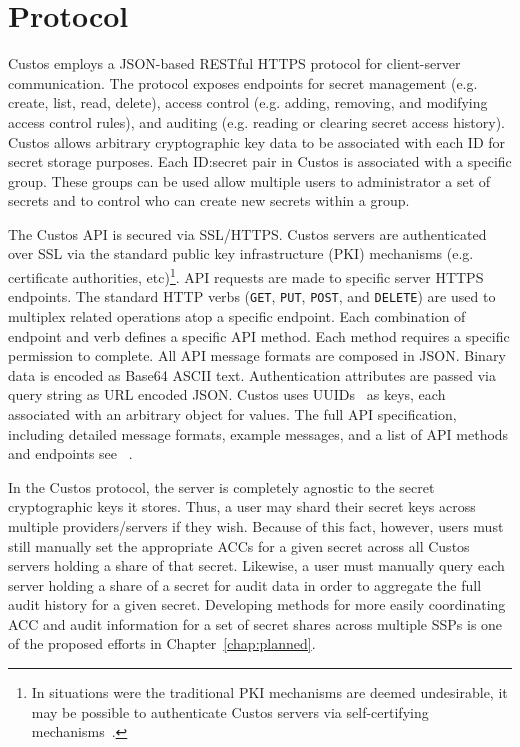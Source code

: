 \section{Protocol}

Custos employs a JSON-based RESTful HTTPS protocol for client-server
communication. The protocol exposes endpoints for secret management
(e.g. create, list, read, delete), access control (e.g. adding,
removing, and modifying access control rules), and auditing
(e.g. reading or clearing secret access history). Custos allows
arbitrary cryptographic key data to be associated with each ID for
secret storage purposes. Each ID:secret pair in Custos is associated
with a specific group. These groups can be used allow multiple users
to administrator a set of secrets and to control who can create new
secrets within a group.

The Custos API is secured via SSL/HTTPS. Custos servers are
authenticated over SSL via the standard public key infrastructure
(PKI) mechanisms (e.g. certificate authorities, etc)\footnote{In
  situations were the traditional PKI mechanisms are deemed
  undesirable, it may be possible to authenticate Custos servers via
  self-certifying mechanisms~\cite{ellison1996, mazieres1999}.}. API
requests are made to specific server HTTPS endpoints. The standard
HTTP verbs (\texttt{GET}, \texttt{PUT}, \texttt{POST}, and
\texttt{DELETE}) are used to multiplex related operations atop a
specific endpoint. Each combination of endpoint and verb defines a
specific API method. Each method requires a specific permission to
complete. All API message formats are composed in JSON. Binary data is
encoded as Base64 ASCII text. Authentication attributes are passed via
query string as URL encoded JSON. Custos uses UUIDs~\cite{leach2005}
as keys, each associated with an arbitrary object for values.  The
full API specification, including detailed message formats, example
messages, and a list of API methods and endpoints see
~\cite{custos-masters}.

In the Custos protocol, the server is completely agnostic to the
secret cryptographic keys it stores. Thus, a user may shard their
secret keys across multiple providers/servers if they wish. Because of
this fact, however, users must still manually set the appropriate ACCs
for a given secret across all Custos servers holding a share of that
secret. Likewise, a user must manually query each server holding a
share of a secret for audit data in order to aggregate the full audit
history for a given secret. Developing methods for more easily
coordinating ACC and audit information for a set of secret shares
across multiple SSPs is one of the proposed efforts in
Chapter~\ref{chap:planned}.

